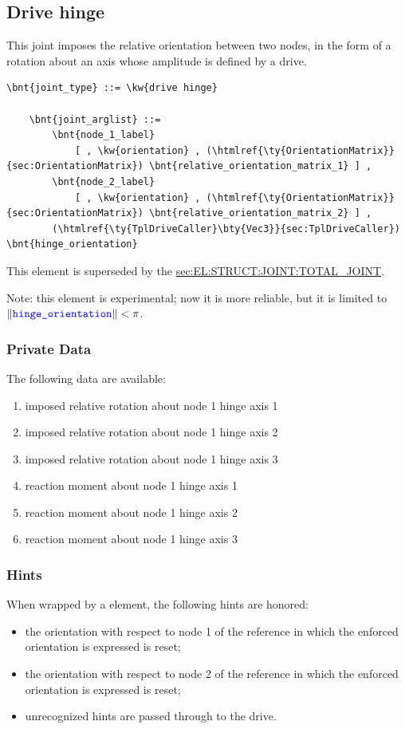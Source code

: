 \subsection{Drive hinge}
\label{sec:EL:JOINT:DRIVEHINGE}
This joint imposes the relative orientation between two nodes,
in the form of a rotation about an axis whose amplitude is defined
by a drive.
\begin{Verbatim}[commandchars=\\\{\}]
    \bnt{joint_type} ::= \kw{drive hinge}

    \bnt{joint_arglist} ::= 
        \bnt{node_1_label}
            [ , \kw{orientation} , (\htmlref{\ty{OrientationMatrix}}{sec:OrientationMatrix}) \bnt{relative_orientation_matrix_1} ] ,
        \bnt{node_2_label}
            [ , \kw{orientation} , (\htmlref{\ty{OrientationMatrix}}{sec:OrientationMatrix}) \bnt{relative_orientation_matrix_2} ] ,
        (\htmlref{\ty{TplDriveCaller}\bty{Vec3}}{sec:TplDriveCaller}) \bnt{hinge_orientation}
\end{Verbatim}
This element is superseded by the
\hyperref{\kw{total joint}}{\kw{total joint}, see Section~}{}{sec:EL:STRUCT:JOINT:TOTAL_JOINT}.

Note: this element is experimental; now it is more reliable, 
but it is limited to $\left\| \textcolor{blue}{\texttt{hinge\_orientation}} \right\| < \pi$.

\subsubsection{Private Data}
The following data are available:
\begin{enumerate}
\item {} imposed relative rotation about node 1 hinge axis 1
\item {} imposed relative rotation about node 1 hinge axis 2
\item {} imposed relative rotation about node 1 hinge axis 3
\item {} reaction moment about node 1 hinge axis 1
\item {} reaction moment about node 1 hinge axis 2
\item {} reaction moment about node 1 hinge axis 3
\end{enumerate}

\subsubsection{Hints}
When wrapped by a  element, the following hints are honored:
\begin{itemize}
\item {} the orientation with respect to node 1
of the reference in which the enforced orientation is expressed is reset;
\item {} the orientation with respect to node 2
of the reference in which the enforced orientation is expressed is reset;
\item unrecognized hints are passed through to the  drive.
\end{itemize}

